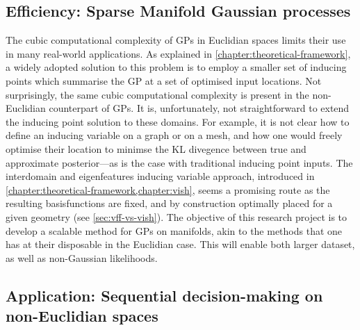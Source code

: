 \subsection{Efficiency: Sparse Manifold Gaussian processes}

The cubic computational complexity of GPs in Euclidian spaces limits their use in many real-world applications. As explained in \cref{chapter:theoretical-framework}, a widely adopted solution to this problem is to employ a smaller set of inducing points which summarise the GP at a set of optimised input locations. Not surprisingly, the same cubic computational complexity is present in the non-Euclidian counterpart of GPs. It is, unfortunately, not straightforward to extend the inducing point solution to these domains. For example, it is not clear how to define an inducing variable on a graph or on a mesh, and how one would freely optimise their location to minimse the KL divegence between true and approximate posterior---as is the case with traditional inducing point inputs. The interdomain and eigenfeatures inducing variable approach, introduced in \cref{chapter:theoretical-framework,chapter:vish}, seems a promising route as the resulting basisfunctions are fixed, and by construction optimally placed for a given geometry (see \cref{sec:vff-vs-vish}). The objective of this research project is to develop a scalable method for GPs on manifolds, akin to the methods that one has at their disposable in the Euclidian case. This will enable both larger dataset, as well as non-Gaussian likelihoods.

\subsection{Application: Sequential decision-making on non-Euclidian spaces}


